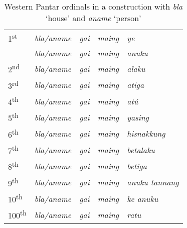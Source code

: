 \begin{table}\centering
 \caption{Western Pantar ordinals in a construction with \textit{bla} `house' and \textit{aname} `person'}





\begin{tabular}{lllll}
1\textsuperscript{st} & \textit{bla/aname} & \textit{gai} & \textit{maing} & \textit{ye}\\
 & \textit{bla/aname} & \textit{gai} & \textit{maing} & \textit{anuku}\\
2\textsuperscript{nd} & \textit{bla/aname} & \textit{gai} & \textit{maing} & \textit{alaku}\\
3\textsuperscript{rd} & \textit{bla/aname} & \textit{gai} & \textit{maing} & \textit{atiga}\\
4\textsuperscript{th} & \textit{bla/aname} & \textit{gai} & \textit{maing} & \textit{at\'u}\\
5\textsuperscript{th} & \textit{bla/aname} & \textit{gai} & \textit{maing} & \textit{yasing}\\
6\textsuperscript{th} & \textit{bla/aname} & \textit{gai} & \textit{maing} & \textit{hisnakkung}\\
7\textsuperscript{th} & \textit{bla/aname} & \textit{gai} & \textit{maing} & \textit{betalaku}\\
8\textsuperscript{th} & \textit{bla/aname} & \textit{gai} & \textit{maing} & \textit{betiga}\\
9\textsuperscript{th} & \textit{bla/aname} & \textit{gai} & \textit{maing} & \textit{anuku tannang}\\
10\textsuperscript{th} & \textit{bla/aname} & \textit{gai} & \textit{maing} & \textit{ke anuku}\\
100\textsuperscript{th} & \textit{bla/aname} & \textit{gai} & \textit{maing} & \textit{ratu}\\
\end{tabular}

\end{table}

